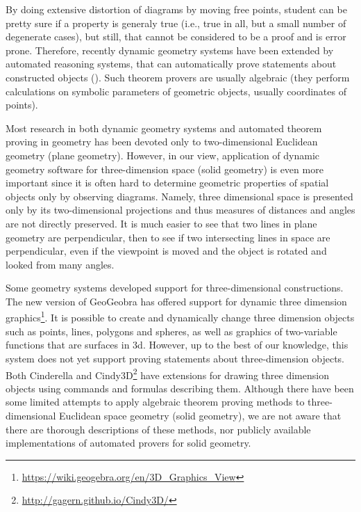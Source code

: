\documentclass[final,1p,times,authoryear]{elsarticle}
\begin{document}
By doing extensive distortion of diagrams by moving free points,
student can be pretty sure if a property is generaly true (i.e., true
in all, but a small number of degenerate cases), but still, that
cannot be considered to be a proof and is error prone. Therefore,
recently dynamic geometry systems have been extended by automated
reasoning systems, that can automatically prove statements about
constructed objects (\cite{geogebra-provers}). Such theorem provers
are usually algebraic (they perform calculations on symbolic
parameters of geometric objects, usually coordinates of points).

Most research in both dynamic geometry systems and automated theorem
proving in geometry has been devoted only to two-dimensional Euclidean
geometry (plane geometry). However, in our view, application of
dynamic geometry software for three-dimension space (solid geometry)
is even more important since it is often hard to determine geometric
properties of spatial objects only by observing diagrams. Namely,
three dimensional space is presented only by its two-dimensional
projections and thus measures of distances and angles are not directly
preserved. It is much easier to see that two lines in plane geometry
are perpendicular, then to see if two intersecting lines in space are
perpendicular, even if the viewpoint is moved and the object is
rotated and looked from many angles.

Some geometry systems developed support for three-dimensional
constructions. The new version of GeoGeobra has offered support for
dynamic three dimension
graphics\footnote{\url{https://wiki.geogebra.org/en/3D_Graphics_View}}. It
is possible to create and dynamically change three dimension objects
such as points, lines, polygons and spheres, as well as graphics of
two-variable functions that are surfaces in 3d. However, up to the
best of our knowledge, this system does not yet support proving
statements about three-dimension objects. Both Cinderella and
Cindy3D\footnote{\url{http://gagern.github.io/Cindy3D/}} have
extensions for drawing three dimension objects using commands and
formulas describing them. Although there have been some limited
attempts to apply algebraic theorem proving methods to
three-dimensional Euclidean space geometry (solid geometry), we are
not aware that there are thorough descriptions of these methods, nor
publicly available implementations of automated provers for solid
geometry.
\end{document}
